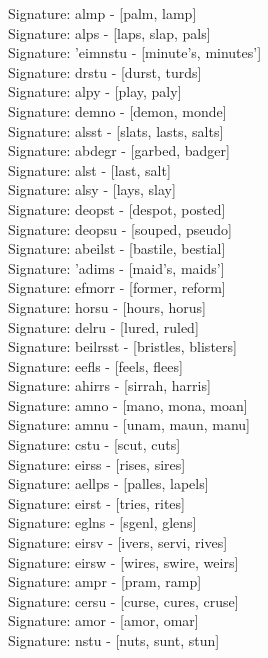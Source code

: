 Signature: {almp} - [palm, lamp] \\
Signature: {alps} - [laps, slap, pals] \\
Signature: {'eimnstu} - [minute's, minutes'] \\
Signature: {drstu} - [durst, turds] \\
Signature: {alpy} - [play, paly] \\
Signature: {demno} - [demon, monde] \\
Signature: {alsst} - [slats, lasts, salts] \\
Signature: {abdegr} - [garbed, badger] \\
Signature: {alst} - [last, salt] \\
Signature: {alsy} - [lays, slay] \\
Signature: {deopst} - [despot, posted] \\
Signature: {deopsu} - [souped, pseudo] \\
Signature: {abeilst} - [bastile, bestial] \\
Signature: {'adims} - [maid's, maids'] \\
Signature: {efmorr} - [former, reform] \\
Signature: {horsu} - [hours, horus] \\
Signature: {delru} - [lured, ruled] \\
Signature: {beilrsst} - [bristles, blisters] \\
Signature: {eefls} - [feels, flees] \\
Signature: {ahirrs} - [sirrah, harris] \\
Signature: {amno} - [mano, mona, moan] \\
Signature: {amnu} - [unam, maun, manu] \\
Signature: {cstu} - [scut, cuts] \\
Signature: {eirss} - [rises, sires] \\
Signature: {aellps} - [palles, lapels] \\
Signature: {eirst} - [tries, rites] \\
Signature: {eglns} - [sgenl, glens] \\
Signature: {eirsv} - [ivers, servi, rives] \\
Signature: {eirsw} - [wires, swire, weirs] \\
Signature: {ampr} - [pram, ramp] \\
Signature: {cersu} - [curse, cures, cruse] \\
Signature: {amor} - [amor, omar] \\
Signature: {nstu} - [nuts, sunt, stun] \\
